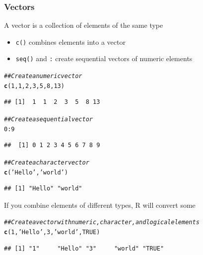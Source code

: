 \documentclass{beamer}\usepackage[]{graphicx}\usepackage[]{xcolor}
\makeatletter
\newcommand{\hlnum}[1]{\textcolor[rgb]{0.686,0.059,0.569}{#1}}%
\newcommand{\hlstr}[1]{\textcolor[rgb]{0.192,0.494,0.8}{#1}}%
\newcommand{\hlcom}[1]{\textcolor[rgb]{0.678,0.584,0.686}{\textit{#1}}}%
\newcommand{\hlopt}[1]{\textcolor[rgb]{0,0,0}{#1}}%
\newcommand{\hlstd}[1]{\textcolor[rgb]{0.345,0.345,0.345}{#1}}%
\newcommand{\hlkwd}[1]{\textcolor[rgb]{0.737,0.353,0.396}{\textbf{#1}}}%
\newenvironment{kframe}{%
 \def\at@end@of@kframe{}%
 \ifinner\ifhmode%
  \def\at@end@of@kframe{\end{minipage}}%
  \begin{minipage}{\columnwidth}%
 \fi\fi%
 \def\FrameCommand##1{\hskip\@totalleftmargin \hskip-\fboxsep
 \colorbox{shadecolor}{##1}\hskip-\fboxsep
     \hskip-\linewidth \hskip-\@totalleftmargin \hskip\columnwidth}%
 \MakeFramed {\advance\hsize-\width
   \@totalleftmargin\z@ \linewidth\hsize
   \@setminipage}}%
 {\par\unskip\endMakeFramed%
 \at@end@of@kframe}
\newenvironment{knitrout}{}{} %
\makeatother
\begin{document}
\begin{frame}[fragile]\frametitle{Vectors}
    A vector is a collection of elements of the same type
    \begin{itemize}
        \item \texttt{c()} combines elements into a vector
        \item \texttt{seq()} and \texttt{:} create sequential vectors of numeric elements
    \end{itemize}
\begin{knitrout}\footnotesize
{}\color{fgcolor}\begin{kframe}
\begin{alltt}
\hlcom{## Create a numeric vector}
\hlkwd{c}\hlstd{(}\hlnum{1}\hlstd{,} \hlnum{1}\hlstd{,} \hlnum{2}\hlstd{,} \hlnum{3}\hlstd{,} \hlnum{5}\hlstd{,} \hlnum{8}\hlstd{,} \hlnum{13}\hlstd{)}
\end{alltt}
\begin{verbatim}
## [1]  1  1  2  3  5  8 13
\end{verbatim}
\begin{alltt}
\hlcom{## Create a sequential vector}
\hlnum{0}\hlopt{:}\hlnum{9}
\end{alltt}
\begin{verbatim}
##  [1] 0 1 2 3 4 5 6 7 8 9
\end{verbatim}
\begin{alltt}
\hlcom{## Create a character vector}
\hlkwd{c}\hlstd{(}\hlstr{'Hello'}\hlstd{,} \hlstr{'world'}\hlstd{)}
\end{alltt}
\begin{verbatim}
## [1] "Hello" "world"
\end{verbatim}
\end{kframe}
\end{knitrout}
    \vspace{2ex} 
    If you combine elements of different types, R will convert some
\begin{knitrout}\footnotesize
{}\color{fgcolor}\begin{kframe}
\begin{alltt}
\hlcom{## Create a vector with numeric, character, and logical elements}
\hlkwd{c}\hlstd{(}\hlnum{1}\hlstd{,} \hlstr{'Hello'}\hlstd{,} \hlnum{3}\hlstd{,} \hlstr{'world'}\hlstd{,} \hlnum{TRUE}\hlstd{)}
\end{alltt}
\begin{verbatim}
## [1] "1"     "Hello" "3"     "world" "TRUE"
\end{verbatim}
\end{kframe}
\end{knitrout}
\end{frame}
\end{document}
